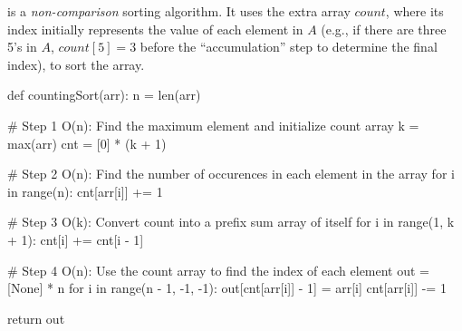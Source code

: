  is a \textit{non-comparison} sorting algorithm. It uses the extra array $count$, where its index initially represents the value of each element in $A$ (e.g., if there are three 5's in $A$, $count[5] = 3$ before the ``accumulation'' step to determine the final index), to sort the array.

\begin{python}
def countingSort(arr):
    n = len(arr)

    # Step 1 O(n): Find the maximum element and initialize count array
    k = max(arr)
    cnt = [0] * (k + 1)

    # Step 2 O(n): Find the number of occurences in each element in the array
    for i in range(n):
        cnt[arr[i]] += 1

    # Step 3 O(k): Convert count into a prefix sum array of itself
    for i in range(1, k + 1):
        cnt[i] += cnt[i - 1]

    # Step 4 O(n): Use the count array to find the index of each element
    out = [None] * n
    for i in range(n - 1, -1, -1):
        out[cnt[arr[i]] - 1] = arr[i]
        cnt[arr[i]] -= 1

    return out
\end{python}

